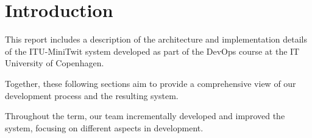 \section{Introduction}
This report includes a description of the architecture and implementation details of the ITU-MiniTwit system developed as part of the DevOps course at the IT University of Copenhagen. 



Together, these following sections aim to provide a comprehensive view of our development process and the resulting system.

Throughout the term, our team incrementally developed and improved the system, focusing on different aspects in development. 

